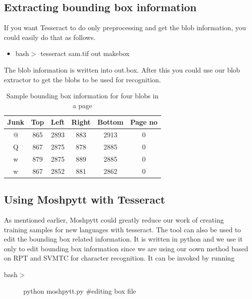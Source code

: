 \subsection{Extracting bounding box information}
If you want Tesseract to do only preprocessing and get the blob information, you could easily do that as follows.
\begin{itemize}
	\item bash$>$ tesseract sam.tif out makebox
\end{itemize}
The blob information is written into out.box. After this you could use our blob extractor to get the blobs to be used for recognition.
\begin{table}[!t]\center
\begin{tabular}{cccccc}
\toprule
\textbf{Junk} & \textbf{Top} & \textbf{Left} & \textbf{Right} & \textbf{Bottom} & \textbf{Page no} \\
\midrule
@ &865 & 2893  & 883 & 2913  &0 \\
Q &867 &2875 &878 &2885  &0 \\
w &879 &2875 &889 &2885 &0 \\
w &867 &2852 &881 &2862 &0 \\

\bottomrule
\end{tabular}
  \caption{Sample bounding box information for four blobs in a page}\label{BBOX}
\end{table}
\subsection{Using Moshpytt with Tesseract}
As mentioned earlier, Moshpytt could greatly reduce our work of creating training samples for new languages with tesseract. The tool can also be used to edit the bounding box related information. It is written in python and we use it only to edit bounding box information since we are using our oown method based on RPT and SVMTC for character recognition. It can be invoked by running 
\begin{description}
	\item[ bash$>$] python moshpytt.py \#editing box file
\end{description}
	
